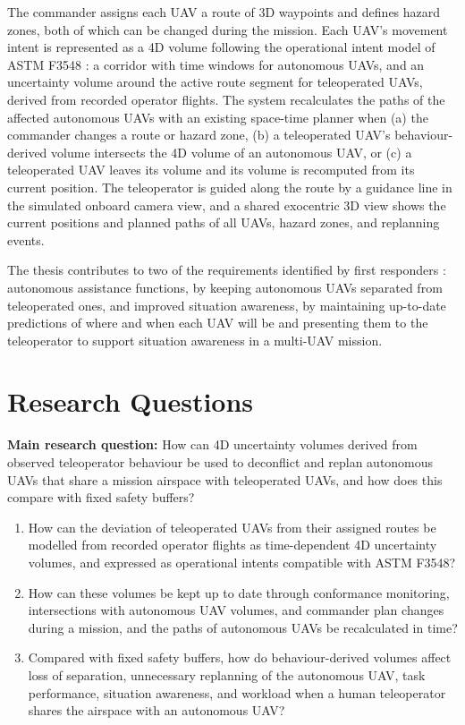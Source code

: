 \documentclass{article}
\begin{document}
The commander assigns each UAV a route of 3D waypoints and defines hazard zones, both of which can be changed during the mission.
Each UAV's movement intent is represented as a 4D volume following the operational intent model of ASTM F3548 \cite{astmf3548}: a corridor with time windows for autonomous UAVs, and an uncertainty volume around the active route segment for teleoperated UAVs, derived from recorded operator flights.
The system recalculates the paths of the affected autonomous UAVs with an existing space-time planner \cite{silver2005} when (a) the commander changes a route or hazard zone, (b) a teleoperated UAV's behaviour-derived volume intersects the 4D volume of an autonomous UAV, or (c) a teleoperated UAV leaves its volume and its volume is recomputed from its current position.
The teleoperator is guided along the route by a guidance line in the simulated onboard camera view, and a shared exocentric 3D view shows the current positions and planned paths of all UAVs, hazard zones, and replanning events.

The thesis contributes to two of the requirements identified by first responders \cite{kruijff2021}: autonomous assistance functions, by keeping autonomous UAVs separated from teleoperated ones, and improved situation awareness, by maintaining up-to-date predictions of where and when each UAV will be and presenting them to the teleoperator to support situation awareness in a multi-UAV mission.

\section{Research Questions}
\textbf{Main research question:} How can 4D uncertainty volumes derived from observed teleoperator behaviour be used to deconflict and replan autonomous UAVs that share a mission airspace with teleoperated UAVs, and how does this compare with fixed safety buffers?

\begin{enumerate}[label=\textbf{RQ\arabic*}]
  \item How can the deviation of teleoperated UAVs from their assigned routes be modelled from recorded operator flights as time-dependent 4D uncertainty volumes, and expressed as operational intents compatible with ASTM F3548?
  \item How can these volumes be kept up to date through conformance monitoring, intersections with autonomous UAV volumes, and commander plan changes during a mission, and the paths of autonomous UAVs be recalculated in time?
  \item Compared with fixed safety buffers, how do behaviour-derived volumes affect loss of separation, unnecessary replanning of the autonomous UAV, task performance, situation awareness, and workload when a human teleoperator shares the airspace with an autonomous UAV?\end{enumerate}
\end{document}
